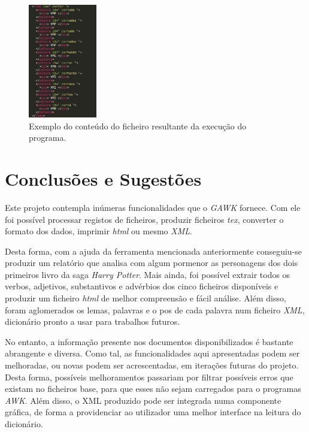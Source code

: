 \documentclass[a4paper]{article}
\begin{document}
\begin{figure}[!h]
    \centering
    \includegraphics[width=3cm]{dic2.png}
    \caption{Exemplo do conteúdo do ficheiro resultante da execução do programa.}
    \label{fig:dic2}
\end{figure}

\newpage


\section{Conclusões e Sugestões}
\label{sec:5}
\hspace{3mm} Este projeto contempla inúmeras funcionalidades que o \textit{GAWK} fornece. Com ele foi possível processar registos de ficheiros, produzir ficheiros \textit{tex}, converter o formato dos dados, imprimir \textit{html} ou mesmo \textit{XML}.

Desta forma, com a ajuda da ferramenta mencionada anteriormente conseguiu-se produzir um relatório que analisa com algum pormenor as personagens dos dois primeiros livro da saga \textit{Harry Potter}. Mais ainda, foi possível extrair todos os verbos, adjetivos, substantivos e advérbios dos cinco ficheiros disponíveis e produzir um ficheiro \textit{html} de melhor compreensão e fácil análise. Além disso, foram aglomerados os lemas, palavras e o pos de cada palavra num ficheiro \textit{XML}, dicionário pronto a usar para trabalhos futuros.

No entanto, a informação presente nos documentos disponibilizados é bastante abrangente e diversa. Como tal, as funcionalidades aqui apresentadas podem ser melhoradas, ou novas podem ser acrescentadas, em iterações futuras do projeto. Desta forma, possíveis melhoramentos passariam por filtrar possíveis erros que existam no ficheiros base, para que esses não sejam carregados para o programas \textit{AWK}. Além disso, o XML produzido pode ser integrada numa componente gráfica, de forma a providenciar ao utilizador uma melhor interface na leitura do dicionário.
\end{document}
